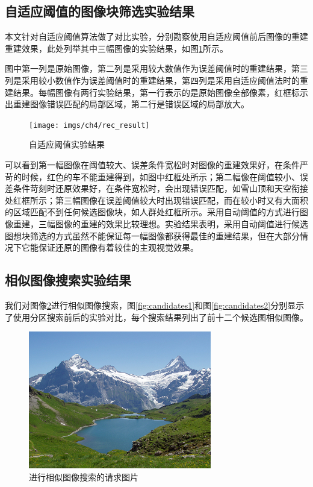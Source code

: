 \subsection{自适应阈值的图像块筛选实验结果}
本文针对自适应阈值算法做了对比实验，分别勘察使用自适应阈值前后图像的重建重建效果，此处列举其中三幅图像的实验结果，如图\ref{fig:result}所示。

图中第一列是原始图像，第二列是采用较大数值作为误差阈值时的重建结果，第三列是采用较小数值作为误差阈值时的重建结果，第四列是采用自适应阈值法时的重建结果。每幅图像有两行实验结果，第一行表示的是原始图像全部像素，红框标示出重建图像错误匹配的局部区域，第二行是错误区域的局部放大。

\begin{figure}
\centering\texttt{[image: imgs/ch4/rec\_result]}
\caption{自适应阈值实验结果}
\label{fig:result}
\end{figure}

可以看到第一幅图像在阈值较大、误差条件宽松时对图像的重建效果好，在条件严苛的时候，红色的车不能重建得到，如图中红框处所示；第二幅像在阈值较小、误差条件苛刻时还原效果好，在条件宽松时，会出现错误匹配，如雪山顶和天空衔接处红框所示；第三幅图像在误差阈值较大时出现错误匹配，而在较小时又有大面积的区域匹配不到任何候选图像块，如人群处红框所示。采用自动阈值的方式进行图像重建，三幅图像的重建的效果比较理想。实验结果表明，采用自动阈值进行候选图想块筛选的方式虽然不能保证每一幅图像都获得最佳的重建结果，但在大部分情况下它能保证还原的图像有着较佳的主观视觉效果。

\subsection{相似图像搜索实验结果}
我们对图像\ref{fig:candi_query}进行相似图像搜索，图\ref{fig:candidates1}和图\ref{fig:candidates2}分别显示了使用分区搜索前后的实验对比，每个搜索结果列出了前十二个候选图相似图像。
\begin{figure}
\centering\includegraphics[width=8cm]{imgs/ch4/candi_query}
\caption{进行相似图像搜索的请求图片}
\label{fig:candi_query}
\end{figure}

